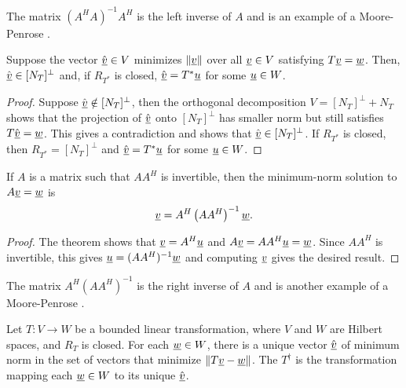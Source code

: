 The matrix $\left( A^H A \right)^{-1} A^H$ is the left inverse of $A$ and is an example of a Moore-Penrose .

\begin{theorem}
Suppose the vector $\hat{\underline{v}} \in V$ minimizes $\| \underline{v} \|$ over all $\underline{v}\in V$ satisfying $T \underline{v} = \underline{w}$.
Then, $\hat{\underline{v}} \in [N_T]^{\bot}$ and, if $R_{T^*}$ is closed, $\hat{\underline{v}} = T^* \underline{u}$ for some $\underline{u}\in W$.
\end{theorem}
\begin{proof}
Suppose $\hat{\underline{v}} \notin [N_T]^{\bot}$, then the orthogonal decomposition $V = [N_T]^{\bot} + N_T$ shows that the projection of $\hat{\underline{v}}$ onto $[N_T]^{\bot}$ has smaller norm but still satisfies $T \hat{\underline{v}} = \underline{w}$.
This gives a contradiction and shows that $\hat{\underline{v}} \in [N_T]^{\bot}$.
If $R_{T^*}$ is closed, then $R_{T^*} = [N_T]^{\bot}$ and $\hat{\underline{v}} = T^* \underline{u}$ for some $\underline{u}\in W$.
\end{proof}

\begin{corollary}
If $A$ is a matrix such that $A A^H$ is invertible, then the minimum-norm solution to $A \underline{v} = \underline{w}$ is
\begin{equation*}
\underline{v} = A^H \left( A A^H \right)^{-1} \underline{w}.
\end{equation*}
\end{corollary}
\begin{proof}
The theorem shows that $\underline{v} = A^H \underline{u}$ and $A \underline{v} = A A^H \underline{u} = \underline{w}$.
Since $A A^H$ is invertible, this gives $\underline{u} = (A A^H)^{-1} \underline{w}$ and computing $\underline{v}$ gives the desired result.
\end{proof}

The matrix $A^H \left( A A^H \right)^{-1}$ is the right inverse of $A$ and is another example of a Moore-Penrose .

\begin{definition}
Let $T : V \rightarrow W$ be a bounded linear transformation, where $V$ and $W$ are Hilbert spaces, and $R_T$ is closed.
For each $\underline{w} \in W$, there is a unique vector $\hat{\underline{v}}$ of minimum norm in the set of vectors that minimize $\left\| T \underline{v} - \underline{w} \right\|$.
The  $T^{\dagger}$ is the transformation mapping each $\underline{w}\in W$ to its unique $\hat{\underline{v}}$.
\end{definition}
